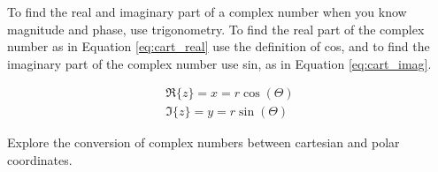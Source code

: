 \documentclass{ximera}
\begin{document}
 
 To find the real and imaginary part of a complex number when you know magnitude and phase, use trigonometry. To find the real part of the complex number as in Equation \ref{eq:cart_real} use the definition of cos, and to find the imaginary part of the complex number use sin, as in Equation \ref{eq:cart_imag}.


\begin{eqnarray}
\Re \{z\} =x= r \cos (\Theta) \label{eq:cart_real}\\
\Im \{z\} =y= r \sin (\Theta)  \label{eq:cart_imag}
\end{eqnarray}


\begin{question}
Explore the conversion of complex numbers between cartesian and polar coordinates.
\begin{center}  
\end{center} 
\end{question}
\end{document}
